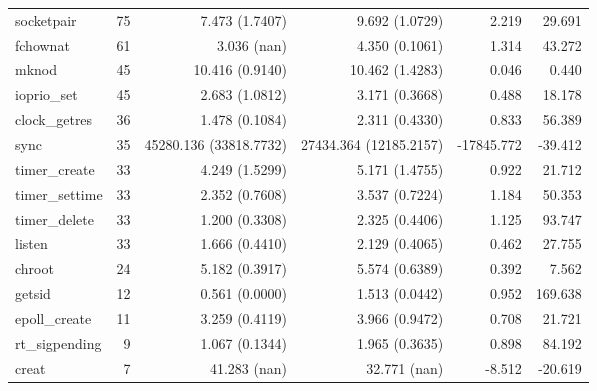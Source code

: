 \begin{longtable}{>{\ttfamily}lrrrrr}
                     socketpair &         75 &              7.473 (1.7407) &            9.692 (1.0729) &           2.219 &       29.691 \\
                       fchownat &         61 &                 3.036 (nan) &            4.350 (0.1061) &           1.314 &       43.272 \\
                          mknod &         45 &             10.416 (0.9140) &           10.462 (1.4283) &           0.046 &        0.440 \\
                    ioprio\_set &         45 &              2.683 (1.0812) &            3.171 (0.3668) &           0.488 &       18.178 \\
                  clock\_getres &         36 &              1.478 (0.1084) &            2.311 (0.4330) &           0.833 &       56.389 \\
                           sync &         35 &      45280.136 (33818.7732) &    27434.364 (12185.2157) &      -17845.772 &      -39.412 \\
                  timer\_create &         33 &              4.249 (1.5299) &            5.171 (1.4755) &           0.922 &       21.712 \\
                 timer\_settime &         33 &              2.352 (0.7608) &            3.537 (0.7224) &           1.184 &       50.353 \\
                  timer\_delete &         33 &              1.200 (0.3308) &            2.325 (0.4406) &           1.125 &       93.747 \\
                         listen &         33 &              1.666 (0.4410) &            2.129 (0.4065) &           0.462 &       27.755 \\
                         chroot &         24 &              5.182 (0.3917) &            5.574 (0.6389) &           0.392 &        7.562 \\
                         getsid &         12 &              0.561 (0.0000) &            1.513 (0.0442) &           0.952 &      169.638 \\
                  epoll\_create &         11 &              3.259 (0.4119) &            3.966 (0.9472) &           0.708 &       21.721 \\
                 rt\_sigpending &          9 &              1.067 (0.1344) &            1.965 (0.3635) &           0.898 &       84.192 \\
                          creat &          7 &                41.283 (nan) &              32.771 (nan) &          -8.512 &      -20.619 \\
\end{longtable}

